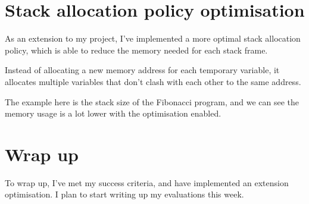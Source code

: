\documentclass[12pt, a4paper]{article}
\begin{document}
\section*{Stack allocation policy optimisation}

As an extension to my project, I've implemented a more optimal stack allocation policy, which is able to reduce the memory needed for each stack frame.

Instead of allocating a new memory address for each temporary variable, it allocates multiple variables that don't clash with each other to the same address.

The example here is the stack size of the Fibonacci program, and we can see the memory usage is a lot lower with the optimisation enabled.


\section*{Wrap up}

To wrap up, I've met my success criteria, and have implemented an extension optimisation. I plan to start writing up my evaluations this week.
\end{document}
